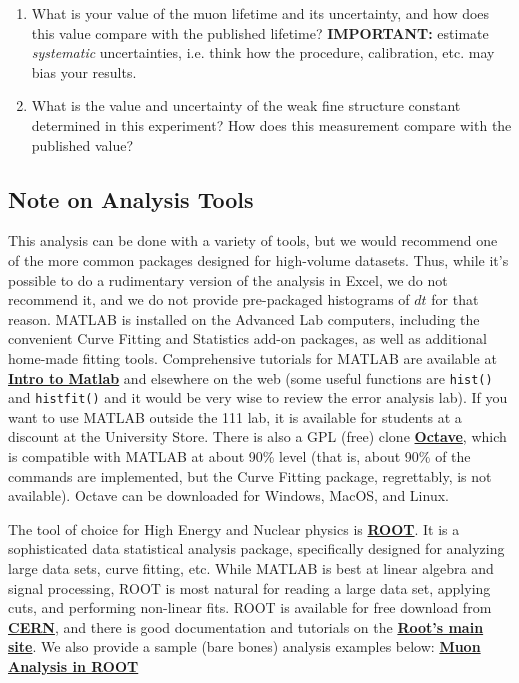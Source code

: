 \documentclass{../lab}
\begin{document}
\begin{enumerate}
\begin{itemize}
    \end{itemize}

    \item What is your value of the muon lifetime and its uncertainty, and how does this value compare with the published lifetime? \textbf{IMPORTANT:} estimate \emph{systematic} uncertainties, i.e. think how the procedure, calibration, etc. may bias your results.

    \item What is the value and uncertainty of the weak fine structure constant determined in this experiment? How does this measurement compare with the published value?

\end{enumerate}

\subsection{Note on Analysis Tools}

This analysis can be done with a variety of tools, but we would recommend one of the more common packages designed for high-volume datasets. Thus, while it's possible to do a rudimentary version of the analysis in Excel, we do not recommend it, and we do not provide pre-packaged histograms of $dt$ for that reason. MATLAB is installed on the Advanced Lab computers, including the convenient Curve Fitting and Statistics add-on packages, as well as additional home-made fitting tools. Comprehensive tutorials for MATLAB are available at \href{http://dev-physicsadv.pantheon.berkeley.edu/matlabintro}{\textbf{Intro to Matlab}} and elsewhere on the web (some useful functions are \texttt{hist()} and \texttt{histfit()} and it would be very wise to review the error analysis lab). If you want to use MATLAB outside the 111 lab, it is available for students at a discount at the University Store. There is also a GPL (free) clone \href{http://www.gnu.org/software/octave/}{\textbf{Octave}}, which is compatible with MATLAB at about 90\% level (that is, about 90\% of the commands are implemented, but the Curve Fitting package, regrettably, is not available). Octave can be downloaded for Windows, MacOS, and Linux.

The tool of choice for High Energy and Nuclear physics is \href{http://root.cern.ch}{\textbf{ROOT}}. It is a sophisticated data statistical analysis package, specifically designed for analyzing large data sets, curve fitting, etc. While MATLAB is best at linear algebra and signal processing, ROOT is most natural for reading a large data set, applying cuts, and performing non-linear fits. ROOT is available for free download from \href{https://root.cern.ch/drupal/content/downloading-root}{\textbf{CERN}}, and there is good documentation and tutorials on the \href{http://root.cern.ch}{\textbf{Root's main site}}. We also provide a sample (bare bones) analysis examples below: \href{http://dev-physicsadv.pantheon.berkeley.edu/node/90}{\textbf{Muon Analysis in ROOT}}
\end{document}
